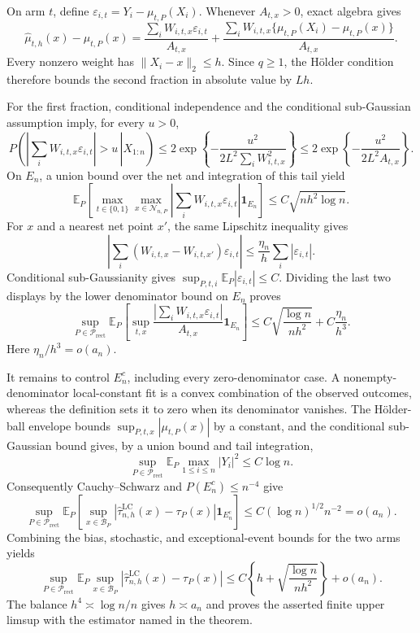 On arm \(t\), define \(\varepsilon_{i,t}=Y_i-\mu_{t,P}(X_i)\).  Whenever \(A_{t,x}>0\), exact algebra gives
\[
 \widehat\mu_{t,h}(x)-\mu_{t,P}(x)
 =\frac{\sum_iW_{i,t,x}\varepsilon_{i,t}}{A_{t,x}}
 +\frac{\sum_iW_{i,t,x}\{\mu_{t,P}(X_i)-\mu_{t,P}(x)\}}{A_{t,x}}.
\]
Every nonzero weight has \(\lVert X_i-x\rVert_2\leq h\).  Since \(q\geq1\), the H\"older condition therefore bounds the second fraction in absolute value by \(Lh\).

For the first fraction, conditional independence and the conditional sub-Gaussian assumption imply, for every \(u>0\),
\[
 P\!\left(\left.\left|\sum_iW_{i,t,x}\varepsilon_{i,t}\right|>u\,\right|X_{1:n}\right)
 \leq2\exp\!\left\{-\frac{u^2}{2L^2\sum_iW_{i,t,x}^2}\right\}
 \leq2\exp\!\left\{-\frac{u^2}{2L^2A_{t,x}}\right\}.
\]
On \(E_n\), a union bound over the net and integration of this tail yield
\[
 \mathbb E_P\!\left[
 \max_{t\in\{0,1\}}\max_{x\in\mathcal N_{n,P}}
 \left|\sum_iW_{i,t,x}\varepsilon_{i,t}\right|\mathbf1_{E_n}
 \right]
 \leq C\sqrt{nh^2\log n}.
\]
For \(x\) and a nearest net point \(x'\), the same Lipschitz inequality gives
\[
 \left|\sum_i(W_{i,t,x}-W_{i,t,x'})\varepsilon_{i,t}\right|
 \leq\frac{\eta_n}{h}\sum_i|\varepsilon_{i,t}|.
\]
Conditional sub-Gaussianity gives \(\sup_{P,t,i}\mathbb E_P|\varepsilon_{i,t}|\leq C\).  Dividing the last two displays by the lower denominator bound on \(E_n\) proves
\[
 \sup_{P\in\mathcal P_{\mathrm{rect}}}
 \mathbb E_P\!\left[
 \sup_{t,x}
 \frac{|\sum_iW_{i,t,x}\varepsilon_{i,t}|}{A_{t,x}}
 \mathbf1_{E_n}
 \right]
 \leq C\sqrt{\frac{\log n}{nh^2}}+C\frac{\eta_n}{h^3}.
\]
Here \(\eta_n/h^3=o(a_n)\).

It remains to control \(E_n^c\), including every zero-denominator case.  A nonempty-denominator local-constant fit is a convex combination of the observed outcomes, whereas the definition sets it to zero when its denominator vanishes.  The H\"older-ball envelope bounds \(\sup_{P,t,x}|\mu_{t,P}(x)|\) by a constant, and the conditional sub-Gaussian bound gives, by a union bound and tail integration,
\[
 \sup_{P\in\mathcal P_{\mathrm{rect}}}\mathbb E_P\max_{1\leq i\leq n}|Y_i|^2\leq C\log n.
\]
Consequently Cauchy--Schwarz and \(P(E_n^c)\leq n^{-4}\) give
\[
 \sup_{P\in\mathcal P_{\mathrm{rect}}}
 \mathbb E_P\!\left[
 \sup_{x\in\mathcal B_P}
 |\widehat\tau^{\mathrm{LC}}_{n,h}(x)-\tau_P(x)|\mathbf1_{E_n^c}
 \right]
 \leq C(\log n)^{1/2}n^{-2}=o(a_n).
\]
Combining the bias, stochastic, and exceptional-event bounds for the two arms yields
\[
 \sup_{P\in\mathcal P_{\mathrm{rect}}}
 \mathbb E_P\sup_{x\in\mathcal B_P}
 |\widehat\tau^{\mathrm{LC}}_{n,h}(x)-\tau_P(x)|
 \leq C\left\{h+\sqrt{\frac{\log n}{nh^2}}\right\}+o(a_n).
\]
The balance \(h^4\asymp\log n/n\) gives \(h\asymp a_n\) and proves the asserted finite upper limsup with the estimator named in the theorem.


